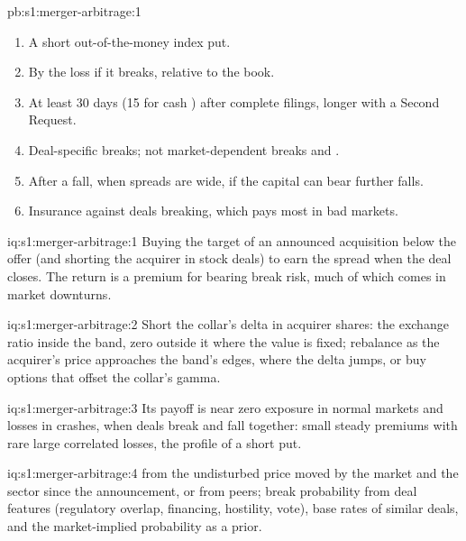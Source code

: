 \begin{solution}{pb:s1:merger-arbitrage:1}
\begin{enumerate}
\item A short out-of-the-money index put.
\item By the loss if it breaks, relative to the book.
\item At least 30 days (15 for cash ) after complete filings, longer with a Second Request.
\item Deal-specific breaks; not market-dependent breaks and .
\item After a fall, when spreads are wide, if the capital can bear further falls.
\item Insurance against deals breaking, which pays most in bad markets.
\end{enumerate}
\end{solution}

\begin{solution}{iq:s1:merger-arbitrage:1}
Buying the target of an announced acquisition below the offer (and shorting the acquirer in stock deals) to earn the spread when the deal closes. The return
is a premium for bearing break risk, much of which comes in market downturns.
\end{solution}

\begin{solution}{iq:s1:merger-arbitrage:2}
Short the collar's delta in acquirer shares: the exchange ratio inside the band, zero outside it where the value is fixed; rebalance as the acquirer's price
approaches the band's edges, where the delta jumps, or buy options that offset the collar's gamma.
\end{solution}

\begin{solution}{iq:s1:merger-arbitrage:3}
Its payoff is near zero exposure in normal markets and losses in crashes, when deals break and  fall together: small steady premiums with rare
large correlated losses, the profile of a short put.
\end{solution}

\begin{solution}{iq:s1:merger-arbitrage:4}
 from the undisturbed price moved by the market and the sector since the announcement, or from peers; break probability from deal features
(regulatory overlap, financing, hostility, vote), base rates of similar deals, and the market-implied probability as a prior.
\end{solution}

